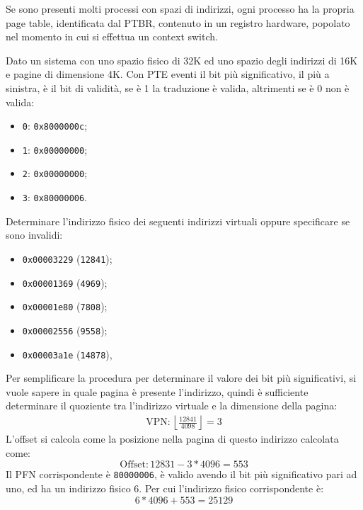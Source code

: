 \documentclass{article}
\numberwithin{equation}{subsection}
\begin{document}
Se sono presenti molti processi con spazi di indirizzi, ogni processo ha la propria page table, identificata dal PTBR, contenuto in un registro hardware, popolato nel 
momento in cui si effettua un context switch. 


Dato un sistema con uno spazio fisico di 32K ed uno spazio degli indirizzi di 16K e pagine di dimensione 4K. Con PTE eventi il bit più significativo, il più a sinistra, 
è il bit di validità, se è 1 la traduzione è valida, altrimenti se è 0 non è valida:
\begin{itemize}
    \item \verb|0|: \verb|0x8000000c|;
    \item \verb|1|: \verb|0x00000000|;
    \item \verb|2|: \verb|0x00000000|;
    \item \verb|3|: \verb|0x80000006|.
\end{itemize}

Determinare l'indirizzo fisico dei seguenti indirizzi virtuali oppure specificare se sono invalidi:
\begin{itemize}
    \item \verb|0x00003229| (\verb|12841|);
    \item \verb|0x00001369| (\verb|4969|);
    \item \verb|0x00001e80| (\verb|7808|);
    \item \verb|0x00002556| (\verb|9558|);
    \item \verb|0x00003a1e| (\verb|14878|), 
\end{itemize}

Per semplificare la procedura per determinare il valore dei bit più significativi, si vuole sapere in quale pagina è presente l'indirizzo, quindi è sufficiente determinare 
il quoziente tra l'indirizzo virtuale e la dimensione della pagina:
\begin{gather*}
    \mathrm{VPN}:\left\lfloor\displaystyle\frac{12841}{4098}\right\rfloor=3
\end{gather*}
L'offset si calcola come la posizione nella pagina di questo indirizzo calcolata come:
\begin{equation*}
    \mathrm{Offset}:12831-3*4096=553
\end{equation*}
Il PFN corrispondente è \verb|80000006|, è valido avendo il bit più significativo pari ad uno, ed ha un indirizzo fisico 6. Per cui l'indirizzo fisico corrispondente è:
\begin{equation*}
    6*4096+553=25129
\end{equation*}
\end{document}
